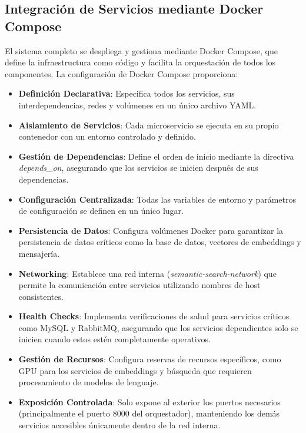 \documentclass[12pt,a4paper]{article}
\begin{document}
\subsection{Integración de Servicios mediante Docker Compose}
\label{subsec:os-docker-compose}

El sistema completo se despliega y gestiona mediante Docker Compose, que define la infraestructura como código y facilita la orquestación de todos los componentes. La configuración de Docker Compose proporciona:

\begin{itemize}
    \item \textbf{Definición Declarativa}: Especifica todos los servicios, sus interdependencias, redes y volúmenes en un único archivo YAML.
    
    \item \textbf{Aislamiento de Servicios}: Cada microservicio se ejecuta en su propio contenedor con un entorno controlado y definido.
    
    \item \textbf{Gestión de Dependencias}: Define el orden de inicio mediante la directiva \textit{depends\_on}, asegurando que los servicios se inicien después de sus dependencias.
    
    \item \textbf{Configuración Centralizada}: Todas las variables de entorno y parámetros de configuración se definen en un único lugar.
    
    \item \textbf{Persistencia de Datos}: Configura volúmenes Docker para garantizar la persistencia de datos críticos como la base de datos, vectores de embeddings y mensajería.
    
    \item \textbf{Networking}: Establece una red interna (\textit{semantic-search-network}) que permite la comunicación entre servicios utilizando nombres de host consistentes.
    
    \item \textbf{Health Checks}: Implementa verificaciones de salud para servicios críticos como MySQL y RabbitMQ, asegurando que los servicios dependientes solo se inicien cuando estos estén completamente operativos.
    
    \item \textbf{Gestión de Recursos}: Configura reservas de recursos específicos, como GPU para los servicios de embeddings y búsqueda que requieren procesamiento de modelos de lenguaje.
    
    \item \textbf{Exposición Controlada}: Solo expone al exterior los puertos necesarios (principalmente el puerto 8000 del orquestador), manteniendo los demás servicios accesibles únicamente dentro de la red interna.
\end{itemize}
\end{document}
